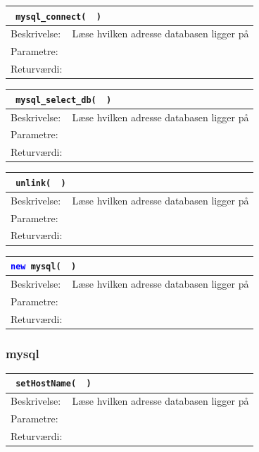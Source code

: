 \begin{table}[H]
\begin{tabular}{l p{12.5cm}}
\multicolumn{2}{l}{\texttt{\textcolor{blue}{} mysql\_connect( \textcolor{blue}{} )}} \\
\hline
Beskrivelse:&Læse hvilken adresse databasen ligger på\\
Parametre:&\\
Returværdi:&\\
\end{tabular}
\end{table}

\begin{table}[H]
\begin{tabular}{l p{12.5cm}}
\multicolumn{2}{l}{\texttt{\textcolor{blue}{} mysql\_select\_db( \textcolor{blue}{} )}} \\
\hline
Beskrivelse:&Læse hvilken adresse databasen ligger på\\
Parametre:&\\
Returværdi:&\\
\end{tabular}
\end{table}

\begin{table}[H]
\begin{tabular}{l p{12.5cm}}
\multicolumn{2}{l}{\texttt{\textcolor{blue}{} unlink( \textcolor{blue}{} )}} \\
\hline
Beskrivelse:&Læse hvilken adresse databasen ligger på\\
Parametre:&\\
Returværdi:&\\
\end{tabular}
\end{table}

\begin{table}[H]
\begin{tabular}{l p{12.5cm}}
\multicolumn{2}{l}{\texttt{\textcolor{blue}{new} mysql( \textcolor{blue}{} )}} \\
\hline
Beskrivelse:&Læse hvilken adresse databasen ligger på\\
Parametre:&\\
Returværdi:&\\
\end{tabular}
\end{table}

\subsubsection{mysql}
\begin{table}[H]
\begin{tabular}{l p{12.5cm}}
\multicolumn{2}{l}{\texttt{\textcolor{blue}{} setHostName( \textcolor{blue}{} )}} \\
\hline
Beskrivelse:&Læse hvilken adresse databasen ligger på\\
Parametre:&\\
Returværdi:&\\
\end{tabular}
\end{table}

